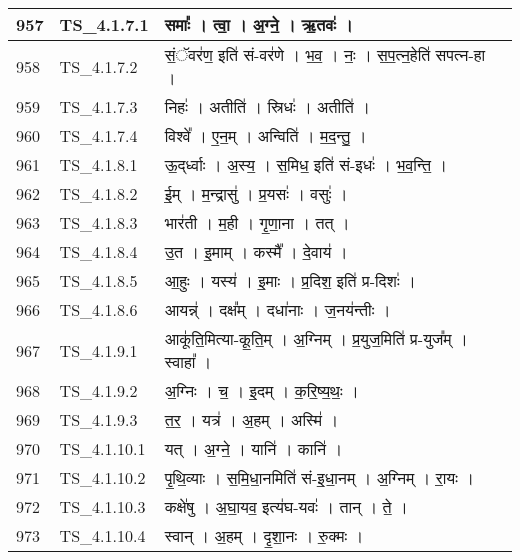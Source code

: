 \documentclass[17pt]{extarticle}
\begin{document}
\begin{longtable}{||p{0.4in}||p{0.9in}||p{4.0in}||p{0.9in}||}
            957 & TS\_4.1.7.1 & समाः᳚   ।   त्वा॒   ।   अ॒ग्ने॒   ।   ऋ॒तवः॑   ।    &      \\
        \hline
            958 & TS\_4.1.7.2 & सं॒ॅवर॑ण॒ इति॑ सं{-}वर॑णे   ।   भ॒व॒   ।   नः॒   ।   स॒प॒त्न॒हेति॑ सपत्न{-}हा   ।    &      \\
        \hline
            959 & TS\_4.1.7.3 & निहः॑   ।   अतीति॑   ।   स्रिधः॑   ।   अतीति॑   ।    &      \\
        \hline
            960 & TS\_4.1.7.4 & विश्वे᳚   ।   ए॒न॒म्   ।   अन्विति॑   ।   म॒द॒न्तु॒   ।    &      \\
        \hline
            961 & TS\_4.1.8.1 & ऊ॒द्‌र्ध्वाः   ।   अ॒स्य॒   ।   स॒मिध॒ इति॑ सं{-}इधः॑   ।   भ॒व॒न्ति॒   ।    &      \\
        \hline
            962 & TS\_4.1.8.2 & ई॒म्   ।   म॒न्द्रासु॑   ।   प्र॒यसः॑   ।   वसुः॑   ।    &      \\
        \hline
            963 & TS\_4.1.8.3 & भार॑ती   ।   म॒ही   ।   गृ॒णा॒ना   ।   तत्   ।    &      \\
        \hline
            964 & TS\_4.1.8.4 & उ॒त   ।   इ॒माम्   ।   कस्मै᳚   ।   दे॒वाय॑   ।    &      \\
        \hline
            965 & TS\_4.1.8.5 & आ॒हुः   ।   यस्य॑   ।   इ॒माः   ।   प्र॒दिश॒ इति॑ प्र{-}दिशः॑   ।    &      \\
        \hline
            966 & TS\_4.1.8.6 & आयन्न्॑   ।   दक्ष᳚म्   ।   दधा॑नाः   ।   ज॒नय॑न्तीः   ।    &      \\
        \hline
            967 & TS\_4.1.9.1 & आकू॑ति॒मित्या{-}कू॒ति॒म्   ।   अ॒ग्निम्   ।   प्र॒युज॒मिति॑ प्र{-}युज᳚म्   ।   स्वाहा᳚   ।    &      \\
        \hline
            968 & TS\_4.1.9.2 & अ॒ग्निः   ।   च॒   ।   इ॒दम्   ।   क॒रि॒ष्य॒थः॒   ।    &      \\
        \hline
            969 & TS\_4.1.9.3 & त॒र॒   ।   यत्र॑   ।   अ॒हम्   ।   अस्मि॑   ।    &      \\
        \hline
            970 & TS\_4.1.10.1 & यत्   ।   अ॒ग्ने॒   ।   यानि॑   ।   कानि॑   ।    &      \\
        \hline
            971 & TS\_4.1.10.2 & पृ॒थि॒व्याः   ।   स॒मि॒धा॒नमिति॑ सं{-}इ॒धा॒नम्   ।   अ॒ग्निम्   ।   रा॒यः   ।    &      \\
        \hline
            972 & TS\_4.1.10.3 & कक्षे॑षु   ।   अ॒घा॒यव॒ इत्य॑घ{-}यवः॑   ।   तान्   ।   ते॒   ।    &      \\
        \hline
            973 & TS\_4.1.10.4 & स्वान्   ।   अ॒हम्   ।   दृ॒शा॒नः   ।   रु॒क्मः   ।    &      \\

\end{longtable}
\end{document}
